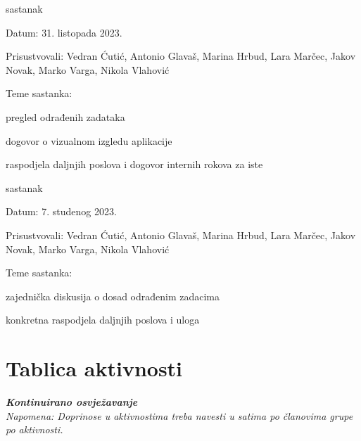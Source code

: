 \begin{packed_enum}
			\item  sastanak
			\item[] \begin{packed_item}
				\item Datum: 31. listopada 2023.
				\item Prisustvovali: Vedran Ćutić, Antonio Glavaš, Marina Hrbud, Lara Marčec, Jakov Novak, Marko Varga, Nikola Vlahović
				\item Teme sastanka:
				\begin{packed_item}
					\item  pregled odrađenih zadataka
					\item  dogovor o vizualnom izgledu aplikacije
					\item  raspodjela daljnjih poslova i dogovor internih rokova za iste
				\end{packed_item}
			\end{packed_item}
			
			\item  sastanak
			\item[] \begin{packed_item}
				\item Datum: 7. studenog 2023.
				\item Prisustvovali: Vedran Ćutić, Antonio Glavaš, Marina Hrbud, Lara Marčec, Jakov Novak, Marko Varga, Nikola Vlahović
				\item Teme sastanka:
				\begin{packed_item}
					\item  zajednička diskusija o dosad odrađenim zadacima
					\item  konkretna raspodjela daljnjih poslova i uloga
				\end{packed_item}
			\end{packed_item}
			
			
		\end{packed_enum}
		
		\eject
		\section*{Tablica aktivnosti}
		
			\textbf{\textit{Kontinuirano osvježavanje}}\\
			
			 \textit{Napomena: Doprinose u aktivnostima treba navesti u satima po članovima grupe po aktivnosti.}

